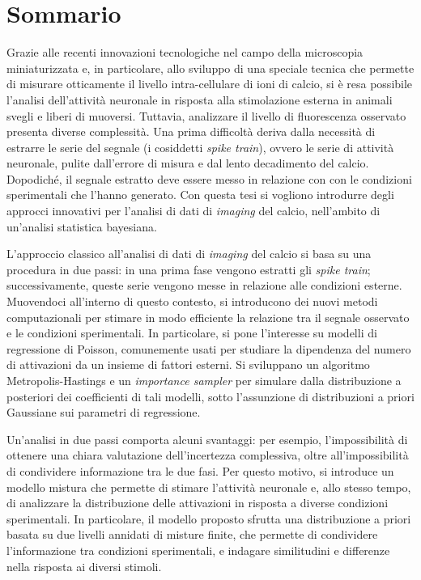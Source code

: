 \chapter*{Sommario} 
Grazie alle recenti innovazioni tecnologiche nel campo della microscopia miniaturizzata e, in particolare, allo sviluppo di una speciale tecnica che permette di misurare otticamente il livello intra-cellulare di ioni di calcio, si è resa possibile l'analisi dell'attività neuronale in risposta alla stimolazione esterna in animali svegli e liberi di muoversi.
Tuttavia, analizzare il livello di fluorescenza osservato presenta diverse complessità. Una prima difficoltà deriva dalla necessità di estrarre le serie del segnale (i cosiddetti \textit{spike train}), ovvero le serie di attività neuronale, pulite dall'errore di misura e dal lento decadimento del calcio. Dopodiché, il segnale estratto deve essere messo in relazione con con le condizioni sperimentali che l'hanno generato. Con questa tesi si vogliono introdurre degli approcci innovativi per l'analisi di dati di \textit{imaging} del calcio, nell'ambito di un'analisi statistica bayesiana.

L'approccio classico all'analisi di dati di \textit{imaging} del calcio si basa su una procedura in due passi: in una prima fase vengono estratti gli \textit{spike train}; successivamente, queste serie vengono messe in relazione alle condizioni esterne. Muovendoci all'interno di questo contesto, si introducono dei nuovi metodi computazionali per stimare in modo efficiente la relazione tra il segnale osservato e le condizioni sperimentali. In particolare, si pone l'interesse su modelli di regressione di Poisson, comunemente usati per studiare la dipendenza del numero di attivazioni da un insieme di fattori esterni. Si sviluppano un algoritmo Metropolis-Hastings e un \textit{importance sampler} per simulare dalla distribuzione a posteriori dei coefficienti di tali modelli, sotto l'assunzione di distribuzioni a priori Gaussiane sui parametri di regressione.

Un'analisi in due passi comporta alcuni svantaggi: per esempio, l'impossibilità di ottenere una chiara valutazione dell'incertezza complessiva, oltre all'impossibilità di condividere informazione tra le due fasi. Per questo motivo, si introduce un modello mistura che permette di stimare l'attività neuronale e, allo stesso tempo, di analizzare la distribuzione delle attivazioni in risposta a diverse condizioni sperimentali. In particolare, il modello proposto sfrutta una distribuzione a priori basata su due livelli annidati di misture finite, che permette di condividere l'informazione tra condizioni sperimentali, e indagare similitudini e differenze nella risposta ai diversi stimoli.

